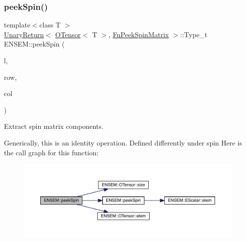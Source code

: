 \subsubsection{\texorpdfstring{peekSpin()}{peekSpin()}\hspace{0.1cm}{\footnotesize\ttfamily [2/2]}}
{\footnotesize\ttfamily template$<$class T $>$ \\
\mbox{\hyperlink{structENSEM_1_1UnaryReturn}{Unary\+Return}}$<$ \mbox{\hyperlink{classENSEM_1_1OTensor}{O\+Tensor}}$<$ T $>$, \mbox{\hyperlink{structENSEM_1_1FnPeekSpinMatrix}{Fn\+Peek\+Spin\+Matrix}} $>$\+::Type\+\_\+t E\+N\+S\+E\+M\+::peek\+Spin (\begin{DoxyParamCaption}\item[{const \mbox{\hyperlink{classENSEM_1_1OTensor}{O\+Tensor}}$<$ T $>$ \&}]{l,  }\item[{int}]{row,  }\item[{int}]{col }\end{DoxyParamCaption})\hspace{0.3cm}{\ttfamily [inline]}}



Extract spin matrix components. 

Generically, this is an identity operation. Defined differently under spin Here is the call graph for this function\+:\nopagebreak
\begin{figure}[H]
\begin{center}
\leavevmode
\includegraphics[width=350pt]{de/d87/group__obstensor_ga7cb1fd7617714b490522aee26dd999be_cgraph}
\end{center}
\end{figure}
\mbox{\label{group__obstensor_gaa0e4faa1f2d2fe041ebdf6ba05a05178}} 
